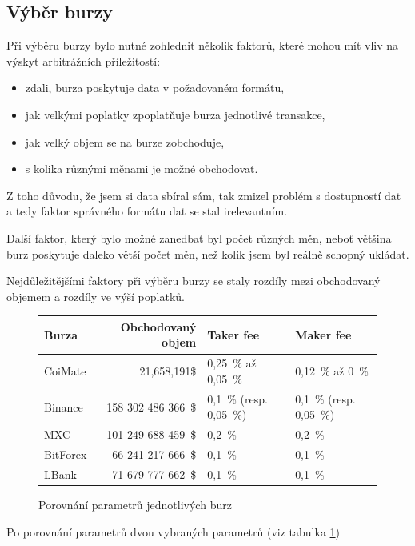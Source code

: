 \documentclass[thesis=B,czech]{FITthesis}[2019/03/21]
\begin{document}
\subsection{Výběr burzy}
Při výběru burzy bylo nutné zohlednit několik faktorů, které mohou mít vliv na výskyt arbitrážních příležitostí: 
\begin{itemize}
    \item zdali, burza poskytuje data v požadovaném formátu,
    \item jak velkými poplatky zpoplatňuje burza jednotlivé transakce,
    \item jak velký objem se na burze zobchoduje,
    \item s kolika různými měnami je možné obchodovat.
\end{itemize}
Z toho důvodu, že jsem si data sbíral sám, tak zmizel problém s dostupností dat a tedy faktor správného formátu dat se stal irelevantním.

Další faktor, který bylo možné zanedbat byl počet různých měn, neboť většina burz poskytuje daleko větší počet měn, než kolik jsem byl reálně schopný ukládat. 

Nejdůležitějšími faktory při výběru burzy se staly rozdíly mezi obchodovaný objemem a rozdíly ve výší poplatků.

\begin{figure}\centering
    \begin{center}
     \begin{tabular}{||l | r | l | l||} 
     \hline
     Burza & Obchodovaný objem & Taker fee & Maker fee \\ [0.5ex]
     \hline\hline
     CoiMate & 21,658,191\$ & 0,25~\% až 0,05~\% & 0,12~\% až 0~\%  \\ 
     \hline
     Binance & 158 302 486 366~\$ & 0,1~\% (resp. 0,05~\%) & 0,1~\% (resp. 0,05~\%)  \\ 
     \hline
     MXC & 101 249 688 459~\$ & 0,2~\% & 0,2~\%  \\ 
     \hline
     BitForex & 66 241 217 666~\$ & 0,1~\% & 0,1~\%  \\ 
     \hline
     LBank & 71 679 777 662~\$ & 0,1~\% & 0,1~\%  \\ 
     \hline
    \end{tabular}
    \end{center}
    \caption{Porovnání parametrů jednotlivých burz}
    \label{exchanges_comparison}
\end{figure}
Po porovnání parametrů dvou vybraných parametrů (viz tabulka \ref{exchanges_comparison})
\end{document}
